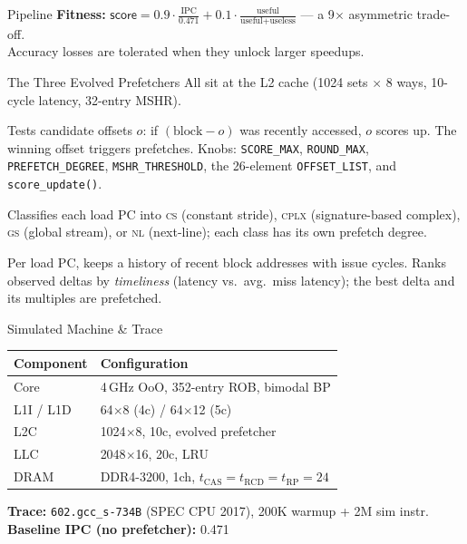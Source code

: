 \documentclass[final]{beamer}
\newlength{\colwidth}
\begin{document}
\begin{frame}[t,fragile]
\begin{columns}[t]
\begin{column}{\colwidth}
\begin{block}{Pipeline}
\medskip
\textbf{Fitness:}
\(\textsf{score} = 0.9 \cdot \tfrac{\text{IPC}}{0.471} + 0.1 \cdot \tfrac{\text{useful}}{\text{useful}+\text{useless}}\)
--- a 9$\times$ asymmetric trade-off.\\[0.4ex]
Accuracy losses are tolerated when they unlock larger speedups.
\end{block}

\begin{block}{The Three Evolved Prefetchers}
All sit at the L2 cache (1024 sets $\times$ 8 ways, 10-cycle latency, 32-entry MSHR).

Tests candidate offsets $o$: if \mbox{$(\text{block} - o)$} was recently accessed, $o$ scores up. The winning offset triggers prefetches.
Knobs: \texttt{SCORE\_MAX}, \texttt{ROUND\_MAX}, \texttt{PREFETCH\_DEGREE}, \texttt{MSHR\_THRESHOLD}, the 26-element \texttt{OFFSET\_LIST}, and \texttt{score\_update()}.

Classifies each load PC into \textsc{cs} (constant stride), \textsc{cplx} (signature-based complex), \textsc{gs} (global stream), or \textsc{nl} (next-line); each class has its own prefetch degree.

Per load PC, keeps a history of recent block addresses with issue cycles. Ranks observed deltas by \emph{timeliness} (latency vs.\ avg.\ miss latency); the best delta and its multiples are prefetched.
\end{block}

\begin{block}{Simulated Machine \& Trace}
\centering
\begin{tabular}{ll}
\toprule
\textbf{Component} & \textbf{Configuration} \\
\midrule
Core      & 4\,GHz OoO, 352-entry ROB, bimodal BP \\
L1I / L1D & 64$\times$8 (4c) / 64$\times$12 (5c) \\
L2C       & 1024$\times$8, 10c, evolved prefetcher \\
LLC       & 2048$\times$16, 20c, LRU \\
DRAM      & DDR4-3200, 1ch, $t_{\text{CAS}}{=}t_{\text{RCD}}{=}t_{\text{RP}}{=}24$ \\
\bottomrule
\end{tabular}

\medskip
\begin{flushleft}
\textbf{Trace:} \texttt{602.gcc\_s-734B} (SPEC CPU 2017), 200K warmup + 2M sim instr.\\[0.5ex]
\textbf{Baseline IPC (no prefetcher):} 0.471
\end{flushleft}
\end{block}


\end{column}
\end{columns}
\end{frame}
\end{document}
